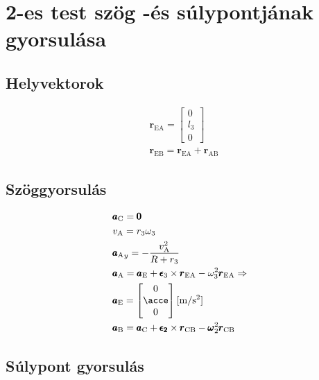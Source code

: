 \section{2-es test szög -és súlypontjának gyorsulása}

\subsection{Helyvektorok}
\begin{align}
	&\pmb{r}_\text{EA} = 
	\begin{bmatrix}
		0 \\ l_3 \\ 0
	\end{bmatrix} \\
	&\pmb{r}_\text{EB} = \pmb{r}_\text{EA} + \pmb{r}_\text{AB}
\end{align}

\subsection{Szöggyorsulás}
\begin{align}
	&\pmb{a}_\text{C} = \pmb{0} \\
	&v_\text{A} = r_3\omega_3 \\
	&{\pmb{a}_\text{A}}_y = - \frac{v_\text{A}^2}{R+r_3} \\
	&\pmb{a}_\text{A} = \pmb{a}_\text{E} + \pmb{\epsilon}_3 \times \pmb{r}_\text{EA} - \omega_3^2\pmb{r}_\text{EA} \Rightarrow \\
	&\pmb{a}_\text{E} =
	\begin{bmatrix}
		0 \\ \acce \\ 0
	\end{bmatrix} \siunit{}{\meter\per\second^2} \\
	&\pmb{a}_\text{B} 
	= \pmb{a}_\text{C} + \pmb{\epsilon_2} \times \pmb{r}_\text{CB} - \pmb{\omega}_2^2\pmb{r}_\text{CB}
\end{align}

\subsection{Súlypont gyorsulás}
